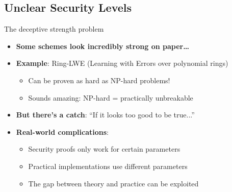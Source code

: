 \documentclass[aspectratio=169, lualatex, handout]{beamer}
\begin{document}
\subsection{Unclear Security Levels}

\begin{frame}{The deceptive strength problem}
	\begin{itemize}
		\item \textbf{Some schemes look incredibly strong on paper\ldots}
		\item \textbf{Example}: Ring-LWE (Learning with Errors over polynomial rings)
		      \begin{itemize}
			      \item Can be proven as hard as NP-hard problems!
			      \item Sounds amazing: NP-hard = practically unbreakable
		      \end{itemize}
		\item \textbf{But there's a catch}: ``If it looks too good to be true...''
		\item \textbf{Real-world complications}:
		      \begin{itemize}
			      \item Security proofs only work for certain parameters
			      \item Practical implementations use different parameters
			      \item The gap between theory and practice can be exploited
		      \end{itemize}
	\end{itemize}
\end{frame}
\end{document}
